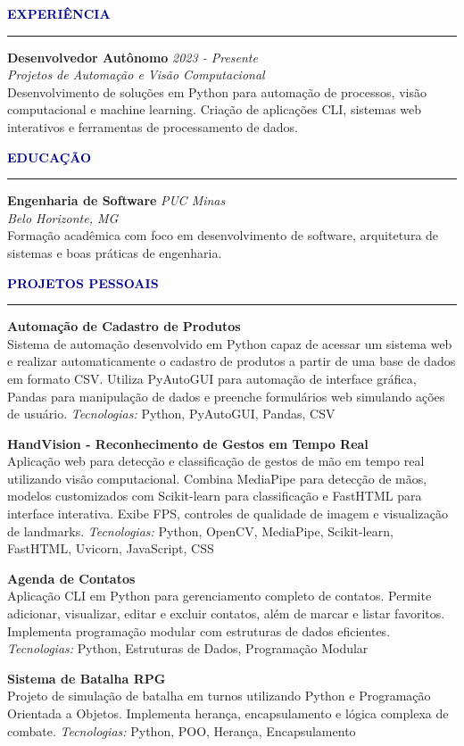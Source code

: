 \documentclass[11pt]{article}
\newcommand{\sectiontitle}[1]{
    \vspace{0.3cm}
    {\large \textbf{\textcolor{darkblue}{#1}}}
    \vspace{0.1cm}
    \hrule
    \vspace{0.2cm}
}
\newcommand{\jobentry}[4]{
    \textbf{#1} \hfill \textit{#2} \\
    \textit{#3} \\
    #4
    \vspace{0.15cm}
}
\newcommand{\projectentry}[2]{
    \textbf{#1} \\
    #2
    \vspace{0.15cm}
}
\begin{document}
\sectiontitle{EXPERIÊNCIA}

\jobentry
{Desenvolvedor Autônomo}{2023 - Presente}
{Projetos de Automação e Visão Computacional}
{Desenvolvimento de soluções em Python para automação de processos, visão computacional e machine learning. Criação de aplicações CLI, sistemas web interativos e ferramentas de processamento de dados.}

\sectiontitle{EDUCAÇÃO}

\jobentry
{Engenharia de Software}{PUC Minas}
{Belo Horizonte, MG}
{Formação acadêmica com foco em desenvolvimento de software, arquitetura de sistemas e boas práticas de engenharia.}

\sectiontitle{PROJETOS PESSOAIS}

\projectentry
{Automação de Cadastro de Produtos}
{Sistema de automação desenvolvido em Python capaz de acessar um sistema web e realizar automaticamente o cadastro de produtos a partir de uma base de dados em formato CSV. Utiliza PyAutoGUI para automação de interface gráfica, Pandas para manipulação de dados e preenche formulários web simulando ações de usuário.
\newline \textit{Tecnologias:} Python, PyAutoGUI, Pandas, CSV}

\projectentry
{HandVision - Reconhecimento de Gestos em Tempo Real}
{Aplicação web para detecção e classificação de gestos de mão em tempo real utilizando visão computacional. Combina MediaPipe para detecção de mãos, modelos customizados com Scikit-learn para classificação e FastHTML para interface interativa. Exibe FPS, controles de qualidade de imagem e visualização de landmarks.
\newline \textit{Tecnologias:} Python, OpenCV, MediaPipe, Scikit-learn, FastHTML, Uvicorn, JavaScript, CSS}

\projectentry
{Agenda de Contatos}
{Aplicação CLI em Python para gerenciamento completo de contatos. Permite adicionar, visualizar, editar e excluir contatos, além de marcar e listar favoritos. Implementa programação modular com estruturas de dados eficientes.
\newline \textit{Tecnologias:} Python, Estruturas de Dados, Programação Modular}

\projectentry
{Sistema de Batalha RPG}
{Projeto de simulação de batalha em turnos utilizando Python e Programação Orientada a Objetos. Implementa herança, encapsulamento e lógica complexa de combate.
\newline \textit{Tecnologias:} Python, POO, Herança, Encapsulamento}
\end{document}
